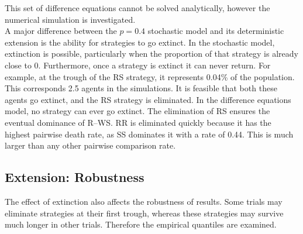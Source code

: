 This set of difference equations cannot be solved analytically, however the numerical simulation is investigated. \\
\FloatBarrier
{}
\FloatBarrier
A major difference between the $p=0.4$ stochastic model and its deterministic extension is the ability for strategies to go extinct. In the stochastic model, extinction is possible, particularly when the proportion of that strategy is already close to 0. Furthermore, once a strategy is extinct it can never return. For example, at the trough of the RS strategy, it represents 0.04\% of the population. This corresponds 2.5 agents in the simulations. It is feasible that both these agents go extinct, and the RS strategy is eliminated. In the difference equations model, no strategy can ever go extinct. The elimination of RS ensures the eventual dominance of R--WS. RR is eliminated quickly because it has the highest pairwise death rate, as SS dominates it with a rate of 0.44. This is much larger than any other pairwise comparison rate.  \\


\subsection{Extension: Robustness} 
The effect of extinction also affects the robustness of results. Some trials may eliminate strategies at their first trough, whereas these strategies may survive much longer in other trials. Therefore the empirical quantiles are examined.\\

